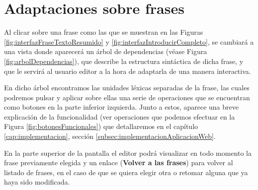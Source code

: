 \section{Adaptaciones sobre frases}

Al clicar sobre una frase como las que se muestran en las Figuras \ref{fig:interfazFraseTextoResumido} y \ref{fig:interfazIntroducirCompleto}, se cambiará a una vista donde aparecerá un árbol de dependencias (véase Figura \ref{fig:arbolDependencias}), que describe la estructura sintáctica de dicha frase, y que le servirá al usuario editor a la hora de adaptarla de una manera interactiva. 

En dicho árbol encontramos las unidades léxicas separadas de la frase, las cuales podremos pulsar y aplicar sobre ellas una serie de operaciones que se encuentran como botones en la parte inferior izquierda. Junto a estos, aparece una breve explicación de la funcionalidad (ver operaciones que podemos efectuar en la Figura \ref{fig:botonesFuncionales}) que detallaremos en el capítulo \ref{cap:implementacion}, sección \ref{subsec:implementacionAplicacionWeb}. 

En la parte superior de la pantalla el editor podrá visualizar en todo momento la frase previamente elegida y un enlace (\textbf{Volver a las frases}) para volver al listado de frases, en el caso de que se quiera elegir otra o retomar alguna que ya haya sido modificada.

